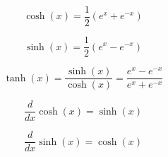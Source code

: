 \begin{equation*}
    \cosh(x) = \frac{1}{2}(e^x + e^{-x})
\end{equation*}

\begin{equation*}
    \sinh(x) = \frac{1}{2}(e^x - e^{-x})
\end{equation*}

\begin{equation*}
    \tanh(x) = \frac{\sinh(x)}{\cosh(x)} = \frac{e^x - e^{-x}}{e^x + e^{-x}}
\end{equation*}

\begin{equation*}
    \frac{d}{dx}\cosh(x) = \sinh(x)
\end{equation*}

\begin{equation*}
    \frac{d}{dx}\sinh(x) = \cosh(x)
\end{equation*}
